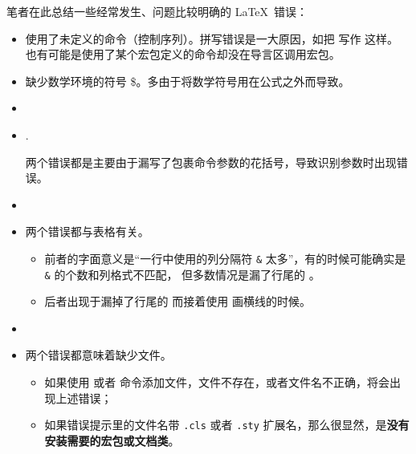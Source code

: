笔者在此总结一些经常发生、问题比较明确的 \LaTeX\ 错误：

\begin{itemize}
\item {}

使用了未定义的命令（控制序列）。拼写错误是一大原因，如把  写作  这样。
也有可能是使用了某个宏包定义的命令却没在导言区调用宏包。

\item {}

缺少数学环境的符号 \$。多由于将数学符号用在公式之外而导致。

\item {}

\item {}.

两个错误都是主要由于漏写了包裹命令参数的花括号，导致识别参数时出现错误。

\item {}

\item {}

两个错误都与表格有关。
\begin{itemize}
  \item 前者的字面意义是“一行中使用的列分隔符 \texttt\& 太多”，有的时候可能确实是 \texttt\& 的个数和列格式不匹配，
  但多数情况是漏了行尾的 。
  \item 后者出现于漏掉了行尾的  而接着使用  画横线的时候。
\end{itemize}

\item {}

\item {}

两个错误都意味着缺少文件。
\begin{itemize}
  \item 如果使用  或者  命令添加文件，文件不存在，或者文件名不正确，将会出现上述错误；
  \item 如果错误提示里的文件名带 \texttt{.cls} 或者 \texttt{.sty} 扩展名，那么很显然，是\textbf{没有安装需要的宏包或文档类}。
\end{itemize}


\end{itemize}
